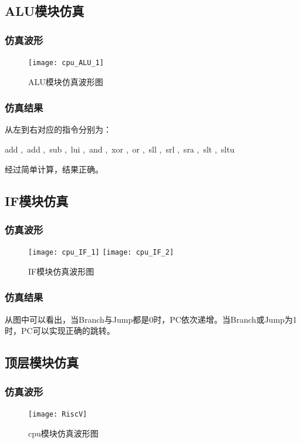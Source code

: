 \documentclass{../source/Experiment}
\begin{document}
        \subsection{ALU模块仿真}
            \subsubsection{仿真波形}
                \begin{figure}[H]
                    \centering
                    \texttt{[image: cpu\_ALU\_1]}
                    \caption{ALU模块仿真波形图}
                \end{figure}               
            \subsubsection{仿真结果}
            从左到右对应的指令分别为：

            add ,\,  add ,\,  sub ,\,  lui ,\,  and ,\,  xor ,\,  or ,\,  sll ,\,  srl ,\,  sra ,\,  slt ,\,  sltu

            经过简单计算，结果正确。

        \subsection{IF模块仿真}
            \subsubsection{仿真波形}
                \begin{figure}[H]
                    \centering
                    \texttt{[image: cpu\_IF\_1]}
                    \texttt{[image: cpu\_IF\_2]}
                    \caption{IF模块仿真波形图}
                \end{figure}    
            \subsubsection{仿真结果}
            从图中可以看出，当Branch与Jump都是0时，PC依次递增。当Branch或Jump为1时，PC可以实现正确的跳转。

        \subsection{顶层模块仿真}
            \subsubsection{仿真波形}
                \begin{figure}[H]
                    \centering
                    \texttt{[image: RiscV]}
                    \caption{cpu模块仿真波形图}
                \end{figure} 
\end{document}
